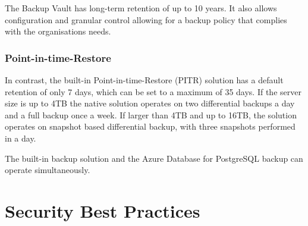 The Backup Vault has long-term retention of up to 10 years. It also allows configuration and granular control allowing for a backup policy that complies with the organisations needs.


\subsubsection{Point-in-time-Restore} \label{theory:PITR}
In contrast, the built-in Point-in-time-Restore (PITR) solution has a default retention of only 7 days, which can be set to a maximum of 35 days. If the server size is up to 4TB the native solution operates on two differential backups a day and a full backup once a week. If larger than 4TB and up to 16TB, the solution operates on snapshot based differential backup, with three snapshots performed in a day.

The built-in backup solution and the Azure Database for PostgreSQL backup can operate simultaneously. 

\section{Security Best Practices} \label{BestStrat}

